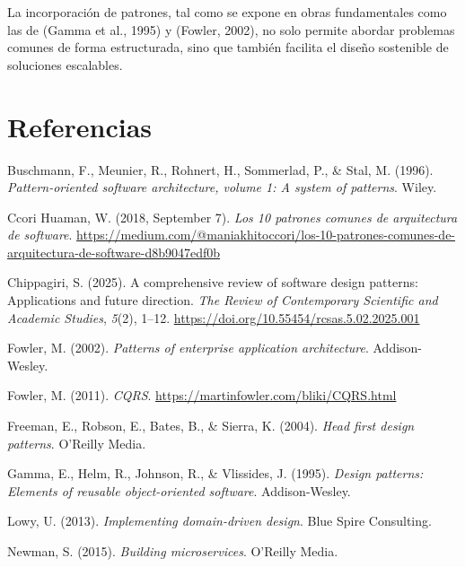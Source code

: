 \documentclass[
  11pt,
  letterpaper,
]{article}
\newlength{\cslhangindent}
\newenvironment{CSLReferences}[2] %
 {\begin{list}{}{%
  \setlength{\itemindent}{0pt}
  \setlength{\leftmargin}{0pt}
  \setlength{\parsep}{0pt}
  \ifodd #1
   \setlength{\leftmargin}{\cslhangindent}
   \setlength{\itemindent}{-1\cslhangindent}
  \fi
  \setlength{\itemsep}{#2\baselineskip}}}
 {\end{list}}
\begin{document}
La incorporación de patrones, tal como se expone en obras fundamentales
como las de (Gamma et al., 1995) y (Fowler, 2002), no solo permite
abordar problemas comunes de forma estructurada, sino que también
facilita el diseño sostenible de soluciones escalables.

\newpage

\newpage

\section{Referencias}\label{referencias}

\label{refs}
\begin{CSLReferences}{1}{0}
Buschmann, F., Meunier, R., Rohnert, H., Sommerlad, P., \& Stal, M.
(1996). \emph{Pattern-oriented software architecture, volume 1: A system
of patterns}. Wiley.

Ccori Huaman, W. (2018, September 7). \emph{Los 10 patrones comunes de
arquitectura de software}.
\url{https://medium.com/@maniakhitoccori/los-10-patrones-comunes-de-arquitectura-de-software-d8b9047edf0b}

Chippagiri, S. (2025). A comprehensive review of software design
patterns: Applications and future direction. \emph{The Review of
Contemporary Scientific and Academic Studies}, \emph{5}(2), 1--12.
\url{https://doi.org/10.55454/rcsas.5.02.2025.001}

Fowler, M. (2002). \emph{Patterns of enterprise application
architecture}. Addison-Wesley.

Fowler, M. (2011). \emph{CQRS}.
\url{https://martinfowler.com/bliki/CQRS.html}

Freeman, E., Robson, E., Bates, B., \& Sierra, K. (2004). \emph{Head
first design patterns}. O'Reilly Media.

Gamma, E., Helm, R., Johnson, R., \& Vlissides, J. (1995). \emph{Design
patterns: Elements of reusable object-oriented software}.
Addison-Wesley.

Lowy, U. (2013). \emph{Implementing domain-driven design}. Blue Spire
Consulting.

Newman, S. (2015). \emph{Building microservices}. O'Reilly Media.


\end{CSLReferences}
\end{document}
